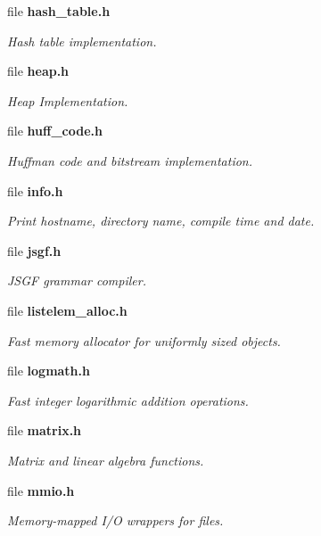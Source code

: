 \begin{DoxyCompactItemize}
file {\bf hash\-\_\-table.\-h}
\begin{DoxyCompactList}\small\item\em Hash table implementation. \end{DoxyCompactList}\item 
file {\bf heap.\-h}
\begin{DoxyCompactList}\small\item\em Heap Implementation. \end{DoxyCompactList}\item 
file {\bf huff\-\_\-code.\-h}
\begin{DoxyCompactList}\small\item\em Huffman code and bitstream implementation. \end{DoxyCompactList}\item 
file {\bf info.\-h}
\begin{DoxyCompactList}\small\item\em Print hostname, directory name, compile time and date. \end{DoxyCompactList}\item 
file {\bf jsgf.\-h}
\begin{DoxyCompactList}\small\item\em J\-S\-G\-F grammar compiler. \end{DoxyCompactList}\item 
file {\bf listelem\-\_\-alloc.\-h}
\begin{DoxyCompactList}\small\item\em Fast memory allocator for uniformly sized objects. \end{DoxyCompactList}\item 
file {\bf logmath.\-h}
\begin{DoxyCompactList}\small\item\em Fast integer logarithmic addition operations. \end{DoxyCompactList}\item 
file {\bf matrix.\-h}
\begin{DoxyCompactList}\small\item\em Matrix and linear algebra functions. \end{DoxyCompactList}\item 
file {\bf mmio.\-h}
\begin{DoxyCompactList}\small\item\em Memory-\/mapped I/\-O wrappers for files. \end{DoxyCompactList}\item 

\end{DoxyCompactItemize}

